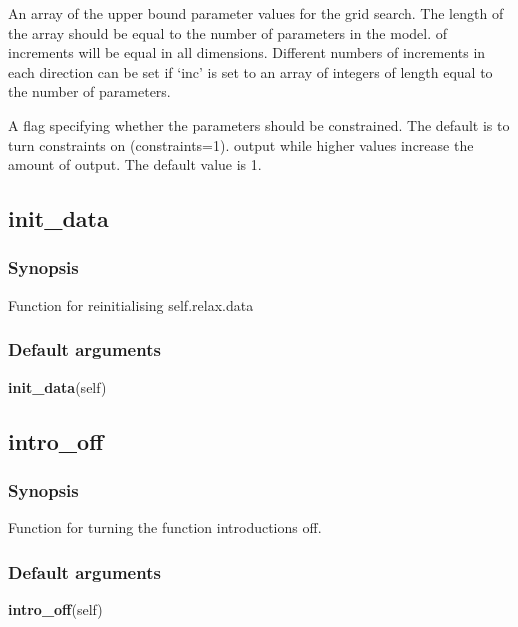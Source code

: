   An array of the upper bound parameter values for the grid search.  The length of the array should be equal to the number of parameters in the model.
of increments will be equal in all dimensions.  Different numbers of increments in each
direction can be set if `inc' is set to an array of integers of length equal to the number
of parameters.

  A flag specifying whether the parameters should be constrained.  The default is to turn constraints on (constraints=1).
output while higher values increase the amount of output.  The default value is 1.


\newpage

\subsection{init\_data}


\subsubsection{Synopsis}

Function for reinitialising self.relax.data

\subsubsection{Default arguments}

\textsf{\textbf{init\_data}(self)}



\newpage

\subsection{intro\_off}


\subsubsection{Synopsis}

Function for turning the function introductions off.

\subsubsection{Default arguments}

\textsf{\textbf{intro\_off}(self)}



\newpage

